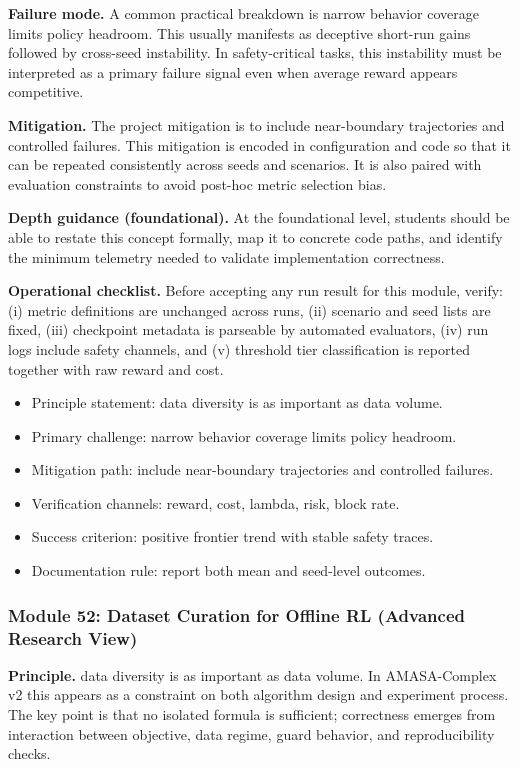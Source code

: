 \documentclass[conference]{IEEEtran}
\begin{document}
\textbf{Failure mode.} A common practical breakdown is narrow behavior coverage limits policy headroom. This usually manifests as deceptive short-run gains followed by cross-seed instability. In safety-critical tasks, this instability must be interpreted as a primary failure signal even when average reward appears competitive.

\textbf{Mitigation.} The project mitigation is to include near-boundary trajectories and controlled failures. This mitigation is encoded in configuration and code so that it can be repeated consistently across seeds and scenarios. It is also paired with evaluation constraints to avoid post-hoc metric selection bias.

\textbf{Depth guidance (foundational).} At the foundational level, students should be able to restate this concept formally, map it to concrete code paths, and identify the minimum telemetry needed to validate implementation correctness.

\textbf{Operational checklist.} Before accepting any run result for this module, verify: (i) metric definitions are unchanged across runs, (ii) scenario and seed lists are fixed, (iii) checkpoint metadata is parseable by automated evaluators, (iv) run logs include safety channels, and (v) threshold tier classification is reported together with raw reward and cost.

\begin{itemize}[leftmargin=*]
  \item Principle statement: data diversity is as important as data volume.
  \item Primary challenge: narrow behavior coverage limits policy headroom.
  \item Mitigation path: include near-boundary trajectories and controlled failures.
  \item Verification channels: reward, cost, lambda, risk, block rate.
  \item Success criterion: positive frontier trend with stable safety traces.
  \item Documentation rule: report both mean and seed-level outcomes.
\end{itemize}


\subsubsection{Module 52: Dataset Curation for Offline RL (Advanced Research View)}
\textbf{Principle.} data diversity is as important as data volume. In AMASA-Complex v2 this appears as a constraint on both algorithm design and experiment process. The key point is that no isolated formula is sufficient; correctness emerges from interaction between objective, data regime, guard behavior, and reproducibility checks.
\end{document}
